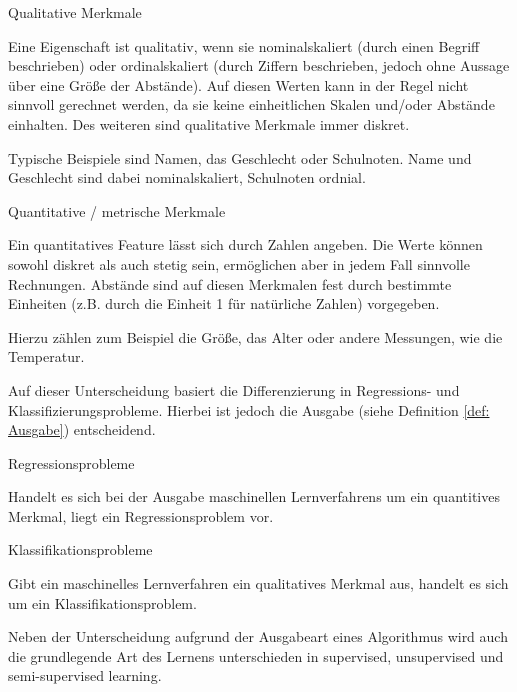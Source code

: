 \begin{definition}
	\label{def: Qualitativ}
	Qualitative Merkmale
	
	Eine Eigenschaft ist qualitativ, wenn sie nominalskaliert (durch einen Begriff beschrieben) oder ordinalskaliert (durch Ziffern beschrieben, jedoch ohne Aussage über eine Größe der Abstände). Auf diesen Werten kann in der Regel nicht sinnvoll gerechnet werden, da sie keine einheitlichen Skalen und/oder Abstände einhalten. Des weiteren sind qualitative Merkmale immer diskret. \cite{Basics-Statistik-Cramer, Basics-Statistik-Sachs}
	
	Typische Beispiele sind Namen, das Geschlecht oder Schulnoten. Name und Geschlecht sind dabei nominalskaliert, Schulnoten ordnial.
\end{definition}

\begin{definition}
	\label{def: Quantitiv}
	Quantitative / metrische Merkmale
	
	Ein quantitatives Feature lässt sich durch Zahlen angeben. Die Werte können sowohl diskret als auch stetig sein, ermöglichen aber in jedem Fall sinnvolle Rechnungen. Abstände sind auf diesen Merkmalen fest durch bestimmte Einheiten (z.B. durch die Einheit 1 für natürliche Zahlen) vorgegeben. \cite{Basics-Statistik-Cramer, Basics-Statistik-Sachs}
	
	Hierzu zählen zum Beispiel die Größe, das Alter oder andere Messungen, wie die Temperatur.
\end{definition}

Auf dieser Unterscheidung basiert die Differenzierung in Regressions- und Klassifizierungsprobleme. Hierbei ist jedoch die Ausgabe (siehe Definition \ref{def: Ausgabe}) entscheidend. 

\begin{definition}
	\label{def: Regression}
	Regressionsprobleme
	
	Handelt es sich bei der Ausgabe maschinellen Lernverfahrens um ein quantitives Merkmal, liegt ein Regressionsproblem vor. \cite{ISLRBuch}
\end{definition}

\begin{definition}
	\label{def: Klassifikation}
	Klassifikationsprobleme
	
	Gibt ein maschinelles Lernverfahren ein qualitatives Merkmal aus, handelt es sich um ein Klassifikationsproblem. \cite{ISLRBuch}
\end{definition}

Neben der Unterscheidung aufgrund der Ausgabeart eines Algorithmus wird auch die grundlegende Art des Lernens unterschieden in supervised, unsupervised und semi-supervised learning.

